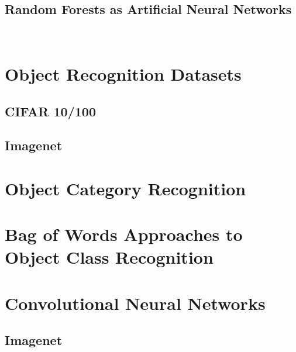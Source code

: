 \subsection{Random Forests as Artificial Neural Networks}
~\cite{Welbl2014casting}

\section{Object Recognition Datasets}
\subsection{CIFAR 10/100}
\subsection{Imagenet}

\section{Object Category Recognition}
\section[Bag of Words]{Bag of Words Approaches to Object Class Recognition}

\section{Convolutional Neural Networks}
\subsection{Imagenet}
